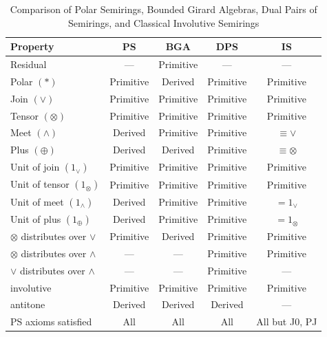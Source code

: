 \begin{table}[!ht]
\centering
\caption{Comparison of Polar Semirings, Bounded Girard Algebras, Dual Pairs of Semirings, and Classical Involutive Semirings}
\label{tab:comparison}
\renewcommand{\arraystretch}{1.2}
\begin{tabular}{lcccc}
\hline
\textbf{Property}
& \textbf{PS}
& \textbf{BGA}
& \textbf{DPS}
& \textbf{IS} \\
\hline

Residual
& ---
& Primitive
& ---
& --- \\

Polar $(*)$
& Primitive
& Derived
& Primitive
& Primitive \\

Join $(\vee)$
& Primitive
& Primitive
& Primitive
& Primitive \\

Tensor $(\otimes)$
& Primitive
& Primitive
& Primitive
& Primitive  \\

Meet $(\wedge)$
& Derived
& Primitive
& Primitive
& $\equiv \vee$ \\

Plus $(\oplus)$
& Derived
& Derived
& Primitive
& $\equiv \otimes$ \\

Unit of join $(1_\vee)$
& Primitive
& Primitive
& Primitive
& Primitive \\


Unit of tensor $(1_\otimes)$
& Primitive
& Primitive
& Primitive
& Primitive \\

Unit of meet $(1_\wedge)$
& Derived
& Primitive
& Primitive
& $=1_\vee$ \\

Unit of plus $(1_\oplus)$
& Derived
& Primitive
& Primitive
& $=1_\otimes$ \\

\hline

$\otimes$ distributes over $\vee$
& Primitive
& Derived
& Primitive
& Primitive \\

$\otimes$ distributes over $\wedge$
& ---
& ---
& Primitive
& Primitive \\

$\vee$ distributes over $\wedge$
& ---
& ---
& Primitive
& --- \\

involutive
& Primitive
& Primitive
& Primitive
& Primitive \\

antitone
& Derived
& Derived
& Derived
& --- \\

\hline

PS axioms satisfied
& All
& All
& All
& All but J0, PJ \\


\hline
\end{tabular}
\end{table}
